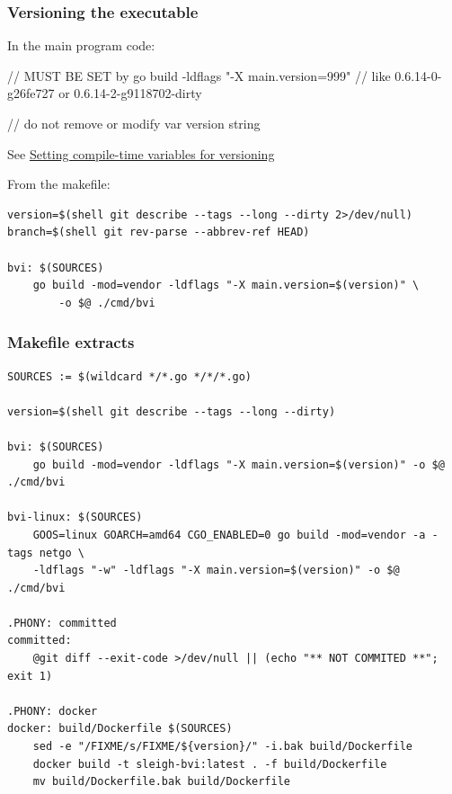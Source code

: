 \documentclass[handout,compress,t,11pt]{beamer}
\begin{document}
\begin{frame}[fragile]
    \frametitle{Versioning the executable}
In the main program code:
\begin{golang}
// MUST BE SET by go build -ldflags "-X main.version=999"
// like 0.6.14-0-g26fe727 or 0.6.14-2-g9118702-dirty

// do not remove or modify
var version string
\end{golang}
See \href{https://medium.com/@joshroppo/setting-go-1-5-variables-at-compile-time-for-versioning-5b30a965d33e}%
{Setting compile-time variables for versioning} \par
\vspace{\baselineskip}
From the makefile:
{\scriptsize
\begin{verbatim}
version=$(shell git describe --tags --long --dirty 2>/dev/null)
branch=$(shell git rev-parse --abbrev-ref HEAD)

bvi: $(SOURCES)
    go build -mod=vendor -ldflags "-X main.version=$(version)" \
        -o $@ ./cmd/bvi
\end{verbatim}}
\end{frame}

\begin{frame}[fragile]
    \frametitle{Makefile extracts}
{\scriptsize
\begin{verbatim}
SOURCES := $(wildcard */*.go */*/*.go)

version=$(shell git describe --tags --long --dirty)

bvi: $(SOURCES)
	go build -mod=vendor -ldflags "-X main.version=$(version)" -o $@ ./cmd/bvi

bvi-linux: $(SOURCES)
	GOOS=linux GOARCH=amd64 CGO_ENABLED=0 go build -mod=vendor -a -tags netgo \
    -ldflags "-w" -ldflags "-X main.version=$(version)" -o $@ ./cmd/bvi

.PHONY: committed
committed:
	@git diff --exit-code >/dev/null || (echo "** NOT COMMITED **"; exit 1)

.PHONY: docker
docker: build/Dockerfile $(SOURCES)
	sed -e "/FIXME/s/FIXME/${version}/" -i.bak build/Dockerfile
	docker build -t sleigh-bvi:latest . -f build/Dockerfile
	mv build/Dockerfile.bak build/Dockerfile
\end{verbatim}}
\end{frame}
\end{document}

